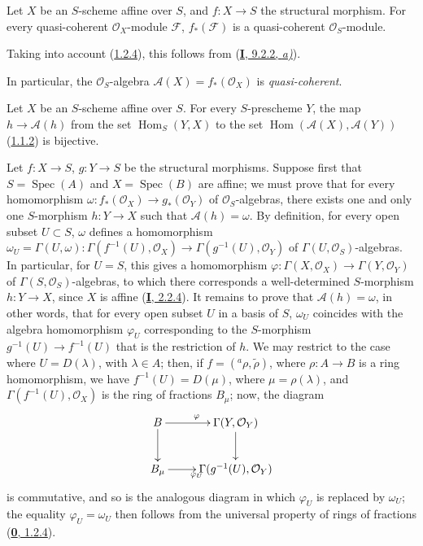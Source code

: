 \begin{proposition}[1.2.6]
\label{II.1.2.6}
Let $X$ be an $S$-scheme affine over $S$, and $f:X\to S$ the structural
morphism. For every quasi-coherent $\mathcal{O}_X$-module $\mathcal{F}$,
$f_*(\mathcal{F})$ is a quasi-coherent $\mathcal{O}_S$-module.
\end{proposition}

Taking into account (\hyperref[II.1.2.4]{1.2.4}), this follows from
(\hyperref[I.9.2.2]{\textbf{I}, 9.2.2, \emph{a)}}).

In particular, the $\mathcal{O}_S$-algebra
$\mathcal{A}(X)=f_*(\mathcal{O}_X)$ is \emph{quasi-coherent}.

\begin{proposition}[1.2.7]
\label{II.1.2.7}
Let $X$ be an $S$-scheme affine over $S$. For every $S$-prescheme
$Y$, the map $h\to\mathcal{A}(h)$ from the set
$\operatorname{Hom}_S(Y,X)$ to the set
$\operatorname{Hom}(\mathcal{A}(X),\mathcal{A}(Y))$
\textup{(\hyperref[II.1.1.2]{1.1.2})} is bijective.
\end{proposition}

Let $f:X\to S$, $g:Y\to S$ be the structural morphisms. Suppose first that
$S=\operatorname{Spec}(A)$ and $X=\operatorname{Spec}(B)$ are affine; we
must prove that for every homomorphism
$\omega:f_*(\mathcal{O}_X)\to g_*(\mathcal{O}_Y)$ of
$\mathcal{O}_S$-algebras, there exists one and only one $S$-morphism
$h:Y\to X$ such that $\mathcal{A}(h)=\omega$. By definition, for every open
subset $U\subset
S$, $\omega$ defines a homomorphism $\omega_U=\Gamma(U,\omega):\Gamma(f^{-1}(U),\mathcal{O}_X)\to\Gamma(g^{-1}(U),\mathcal{O}_Y)$
of $\Gamma(U,\mathcal{O}_S)$-algebras. In particular, for $U=S$, this
gives a homomorphism
$\varphi:\Gamma(X,\mathcal{O}_X)\to\Gamma(Y,\mathcal{O}_Y)$ of
$\Gamma(S,\mathcal{O}_S)$-algebras, to which there corresponds a
well-determined $S$-morphism $h:Y\to X$, since $X$ is affine
(\hyperref[I.2.2.4]{\textbf{I}, 2.2.4}). It remains to prove that
$\mathcal{A}(h)=\omega$, in other words, that for every open subset $U$ in a
basis of $S$, $\omega_U$ coincides with the algebra homomorphism $\varphi_U$
corresponding to the $S$-morphism $g^{-1}(U)\to f^{-1}(U)$ that is the
restriction of $h$.
We may restrict to the case where $U=D(\lambda)$, with $\lambda\in A$; then,
if $f=({}^a\rho,\widetilde{\rho})$, where $\rho:A\to B$ is a ring
homomorphism, we have $f^{-1}(U)=D(\mu)$, where $\mu=\rho(\lambda)$, and
$\Gamma(f^{-1}(U),\mathcal{O}_X)$ is the ring of fractions $B_\mu$; now,
the diagram
\[
  \xymatrix{
    B\ar[r]^\varphi\ar[d] & \Gamma(Y,\mathcal{O}_Y)\ar[d]\\
    B_\mu\ar[r]_{\varphi_U} & \Gamma(g^{-1}(U),\mathcal{O}_Y)
  }
\]
is commutative, and so is the analogous diagram in which $\varphi_U$
is replaced by $\omega_U$; the equality $\varphi_U=\omega_U$ then follows
from the universal property of rings of fractions
(\hyperref[0.1.2.4]{\textbf{0}, 1.2.4}).

